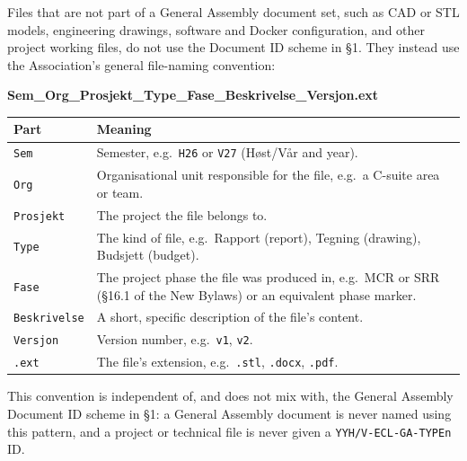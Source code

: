 \documentclass{../../../Common/Latex/Templates/rapport}
\begin{document}
Files that are not part of a General Assembly document set, such as CAD or STL models, engineering drawings, software and Docker configuration, and other project working files, do not use the Document ID scheme in \S1. They instead use the Association's general file-naming convention:
\begin{center}
  \bfseries Sem\_Org\_Prosjekt\_Type\_Fase\_Beskrivelse\_Versjon.ext
\end{center}

\begin{longtable}{|L{2.6cm}|L{11cm}|}
  \hline
  \textbf{Part} & \textbf{Meaning} \\
  \hline
  \endhead
  \texttt{Sem}         & Semester, e.g.\ \texttt{H26} or \texttt{V27} (Høst/Vår and year). \\
  \hline
  \texttt{Org}         & Organisational unit responsible for the file, e.g.\ a C-suite area or team. \\
  \hline
  \texttt{Prosjekt}    & The project the file belongs to. \\
  \hline
  \texttt{Type}        & The kind of file, e.g.\ Rapport (report), Tegning (drawing), Budsjett (budget). \\
  \hline
  \texttt{Fase}        & The project phase the file was produced in, e.g.\ MCR or SRR (\S16.1 of the New Bylaws) or an equivalent phase marker. \\
  \hline
  \texttt{Beskrivelse} & A short, specific description of the file's content. \\
  \hline
  \texttt{Versjon}     & Version number, e.g.\ \texttt{v1}, \texttt{v2}. \\
  \hline
  \texttt{.ext}        & The file's extension, e.g.\ \texttt{.stl}, \texttt{.docx}, \texttt{.pdf}. \\
  \hline
\end{longtable}

This convention is independent of, and does not mix with, the General Assembly Document ID scheme in \S1: a General Assembly document is never named using this pattern, and a project or technical file is never given a \texttt{YYH/V-ECL-GA-TYPEn} ID.
\end{document}
